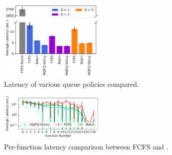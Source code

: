 \begin{figure}
  \includegraphics[width=0.45\textwidth]{../graphs/q_compare/25.7/20/paper_e2e_sec.pdf}
  \vspace*{\captionspace}
  \caption{Latency of various queue policies compared.}
  \label{fig:queue-e2e}
  \vspace{\myfigspace}
\end{figure}



\begin{figure}
  \includegraphics[width=0.45\textwidth]{../graphs/q_compare/25.7/20/paper_fairness_squish.pdf}
  \vspace*{\captionspace}
  \caption{Per-function latency comparison between FCFS and \QName.}
  \label{fig:queue-fairness}
  \vspace{\myfigspace}
\end{figure}

